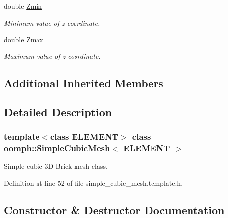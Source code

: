 \begin{DoxyCompactItemize}
double \hyperlink{classoomph_1_1SimpleCubicMesh_af01c08e1e33360eaa2102d0bebb11bcd}{Zmin}
\begin{DoxyCompactList}\small\item\em Minimum value of z coordinate. \end{DoxyCompactList}\item 
double \hyperlink{classoomph_1_1SimpleCubicMesh_aec11ab3ae84b1ba658024d833b7eafbf}{Zmax}
\begin{DoxyCompactList}\small\item\em Maximum value of z coordinate. \end{DoxyCompactList}\end{DoxyCompactItemize}
\subsection*{Additional Inherited Members}


\subsection{Detailed Description}
\subsubsection*{template$<$class E\+L\+E\+M\+E\+NT$>$\newline
class oomph\+::\+Simple\+Cubic\+Mesh$<$ E\+L\+E\+M\+E\+N\+T $>$}

Simple cubic 3D Brick mesh class. 

Definition at line 52 of file simple\+\_\+cubic\+\_\+mesh.\+template.\+h.



\subsection{Constructor \& Destructor Documentation}
\mbox{\label{classoomph_1_1SimpleCubicMesh_a6732b9fc1cd2e98929158fc300b5b0c7}} 
